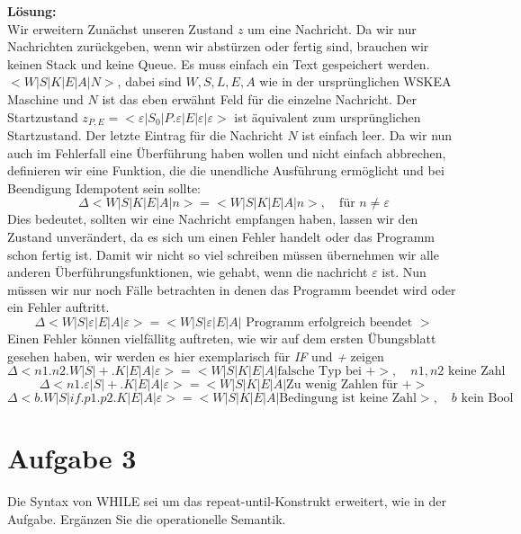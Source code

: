 \documentclass[11pt,a4paper,ngerman]{article}
\begin{document}
\textbf{Lösung:}\\

Wir erweitern Zunächst unseren Zustand $z$ um eine Nachricht. Da wir nur Nachrichten zurückgeben, wenn wir abstürzen oder fertig sind, brauchen wir keinen Stack und keine Queue. Es muss einfach ein Text gespeichert werden.
$<W | S | K | E | A | N >$, dabei sind $W,S,L,E,A$ wie in der ursprünglichen WSKEA Maschine und $N$ ist das eben erwähnt Feld für die einzelne Nachricht. Der Startzustand $z_{P,E} = < \varepsilon | S_0 | P.\varepsilon | E | \varepsilon | \varepsilon >$ ist äquivalent zum ursprünglichen Startzustand. Der letzte Eintrag für die Nachricht $N$ ist einfach leer. Da wir nun auch im Fehlerfall eine Überführung haben wollen und nicht einfach abbrechen, definieren wir eine Funktion, die die unendliche Ausführung ermöglicht und bei Beendigung Idempotent sein sollte:
$$
\Delta < W | S | K | E | A | n > = <W | S | K | E | A | n >, \quad \text{für }n \not= \varepsilon
$$
Dies bedeutet, sollten wir eine Nachricht empfangen haben, lassen wir den Zustand unverändert, da es sich um einen Fehler handelt oder das Programm schon fertig ist. Damit wir nicht so viel schreiben müssen übernehmen wir alle anderen Überführungsfunktionen, wie gehabt, wenn die nachricht $\varepsilon$ ist. Nun müssen wir nur noch Fälle betrachten in denen das Programm beendet wird oder ein Fehler auftritt.
$$
\Delta < W | S | \varepsilon | E | A | \varepsilon> = < W | S | \varepsilon | E | A | \text{ Programm erfolgreich beendet }>
$$
Einen Fehler können vielfällitg auftreten, wie wir auf dem ersten Übungsblatt gesehen haben, wir werden es hier exemplarisch für \emph{IF} und \emph{+} zeigen
$$
\Delta <n1.n2.W | S | +.K | E | A | \varepsilon > = < W | S | K | E | A | \text{falsche Typ bei +} >, \quad n1,n2\text{ keine Zahl}
$$
$$
\Delta <n1.\varepsilon | S | +.K | E | A | \varepsilon> = < W | S | K | E | A |\text{Zu wenig Zahlen für +}>
$$
$$
\Delta <b.W | S | if.p1.p2.K | E | A | \varepsilon > = < W | S | K | E | A |\text{Bedingung ist keine Zahl}>, \quad b\text{ kein Bool}
$$

\section*{Aufgabe 3}
Die Syntax von WHILE sei um das repeat-until-Konstrukt erweitert, wie in der Aufgabe. Ergänzen Sie die operationelle Semantik.\\
\end{document}
